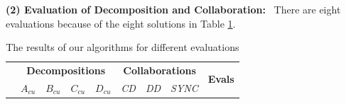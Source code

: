 \begin{table}[htb!]
\begin{tabular}{|c|c|c|c|c|c|c|c|c|}
\hline
\end{tabular}
\end{table}


\textbf{(2) Evaluation of Decomposition and Collaboration:} \
There are eight evaluations because of the eight solutions in Table \ref{Evaluations}.

\begin{table}[htb!]
\centering
\scriptsize
\caption{\label{Evaluations}The results of our algorithms for different evaluations}
\begin{tabular}{|c|c|c|c|c|c|c|c|c|}
\hline
\multirow{2}{*}{} &
\multicolumn{4}{|c|}{\textbf{Decompositions}} & \multicolumn{3}{|c|}{\textbf{Collaborations}} &
\multirow{2}{*}{\textbf{Evals}} \\
\cline{2-8}
   &$A_{cu}$ &$B_{cu}$ &$C_{cu}$ &$D_{cu}$ &\emph{ CD } &\emph{ DD } &\emph{SYNC} \\


\end{tabular}
\end{table}
